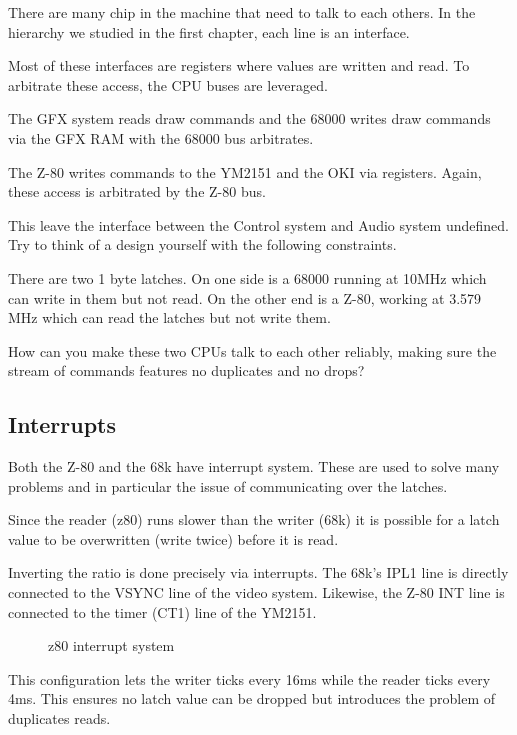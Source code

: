 There are many chip in the machine that need to talk to each others. In the hierarchy we studied in the first chapter, each line is an interface. 


Most of these interfaces are registers where values are written and read. To arbitrate these access, the CPU buses are leveraged.

The GFX system reads draw commands and the 68000 writes draw commands via the GFX RAM with the 68000 bus arbitrates.

The Z-80 writes commands to the YM2151 and the OKI via registers. Again, these access is arbitrated by the Z-80 bus.

This leave the interface between the Control system and Audio system undefined. Try to think of a design yourself with the following constraints.

There are two 1 byte latches. On one side is a 68000 running at 10MHz which can write in them but not read. On the other end is a Z-80, working at 3.579 MHz which can read the latches but not write them. 

How can you make these two CPUs talk to each other reliably, making sure the stream of commands features no duplicates and no drops?

\subsection{Interrupts}

Both the Z-80 and the 68k have interrupt system. These are used to solve many problems and in particular the issue of communicating over the latches.

Since the reader (z80) runs slower than the writer (68k) it is possible for a latch value to be overwritten (write twice) before it is read. 

Inverting the ratio is done precisely via interrupts. The 68k's IPL1 line is directly connected to the VSYNC line of the video system. Likewise, the Z-80 INT line is connected to the timer (CT1) line of the YM2151.

\begin{figure}[H]
\caption*{z80 interrupt system}
\end{figure}

This configuration lets the writer ticks every 16ms while the reader ticks every 4ms. This ensures no latch value can be dropped but introduces the problem of duplicates reads.

